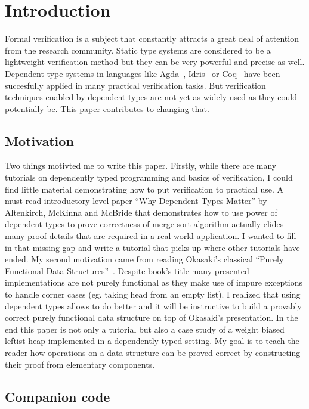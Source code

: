 \section{Introduction}

Formal verification is a subject that constantly attracts a great deal of attention from the research community. Static type systems are considered to be a lightweight verification method but they can be very powerful and precise as well. Dependent type systems in languages like Agda~\cite{Nor07}, Idris~\cite{Bra13} or Coq~\cite{coq} have been succesfully applied in many practical verification tasks. But verification techniques enabled by dependent types are not yet as widely used as they could potentially be. This paper contributes to changing that.

\subsection{Motivation}

Two things motivted me to write this paper. Firstly, while there are many tutorials on dependently typed programming and basics of verification, I could find little material demonstrating how to put verification to practical use. A must-read introductory level paper ``Why Dependent Types Matter'' by Altenkirch, McKinna and McBride \cite{AltMcBMcK05} that demonstrates how to use power of dependent types to prove correctness of merge sort algorithm actually elides many proof details that are required in a real-world application. I wanted to fill in that missing gap and write a tutorial that picks up where other tutorials have ended. My second motivation came from reading Okasaki's classical ``Purely Functional Data Structures''~\cite{Oka99}. Despite book's title many presented implementations are not purely functional as they make use of impure exceptions to handle corner cases (eg. taking head from an empty list). I realized that using dependent types allows to do better and it will be instructive to build a provably correct purely functional data structure on top of Okasaki's presentation. In the end this paper is not only a tutorial but also a case study of a weight biased leftist heap implemented in a dependently typed setting. My goal is to teach the reader how operations on a data structure can be proved correct by constructing their proof from elementary components.

\subsection{Companion code}

